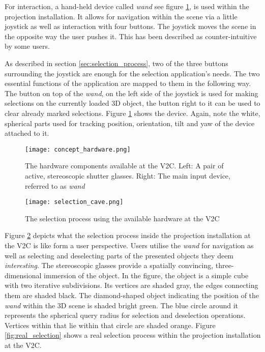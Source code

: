 For interaction, a hand-held device called \textit{wand} see figure \ref{fig:concept_hardware}, is used within the projection installation. It allows for navigation within the scene via a little joystick as well as interaction with four buttons. The joystick moves the scene in the opposite way the user pushes it. This has been described as counter-intuitive by some users.

As described in section \ref{sec:selection_process}, two of the three buttons surrounding the joystick are enough for the selection application's needs. The two essential functions of the application are mapped to them in the following way. The button on top of the \textit{wand}, on the left side of the joystick is used for making selections on the currently loaded 3D object, the button  right to it can be used to clear already marked selections. Figure \ref{fig:concept_hardware} shows the device. Again, note the white, spherical parts used for tracking position, orientation, tilt and yaw of the device attached to it.

\begin{figure}[htb]
  \centering
  \texttt{[image: concept\_hardware.png]}\\ %
  \caption{The hardware components available at the V2C. Left: A pair of active, stereoscopic shutter glasses. Right: The main input device, referred to as \textit{wand}}
  \label{fig:concept_hardware}
\end{figure}

\begin{figure}[htb]
  \centering
  \texttt{[image: selection\_cave.png]}\\ %
  \caption{The selection process using the available hardware at the V2C}\label{fig:selection_cave}
\end{figure}

Figure \ref{fig:selection_cave} depicts what the selection process inside the projection installation at the V2C is like form a user perspective. Users utilise the \textit{wand} for navigation as well as selecting and deselecting parts of the presented objects they deem \textit{interesting}. The stereoscopic glasses provide a spatially convincing, three-dimensional immersion of the object. In the figure, the object is a simple cube with two iterative subdivisions. Its vertices are shaded gray, the edges connecting them are shaded black. The diamond-shaped object indicating the position of the \textit{wand} within the 3D scene is shaded bright green. The blue circle around it represents the spherical query radius for selection and deselection operations. Vertices within that lie within that circle are shaded orange. Figure \ref{fig:real_selection} shows a real selection process within the projection installation at the V2C.

